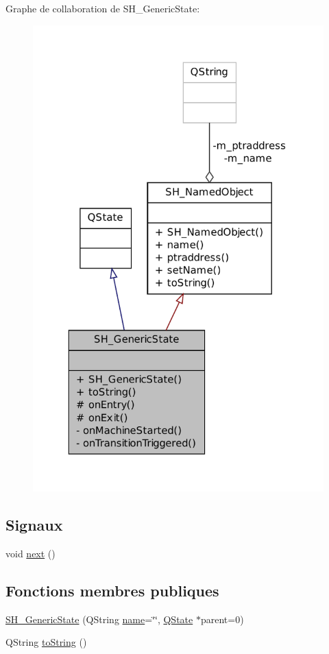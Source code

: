 Graphe de collaboration de S\-H\-\_\-\-Generic\-State\-:\nopagebreak
\begin{figure}[H]
\begin{center}
\leavevmode
\includegraphics[width=319pt]{classSH__GenericState__coll__graph}
\end{center}
\end{figure}
\subsection*{Signaux}
\begin{DoxyCompactItemize}
\item 
void \hyperlink{classSH__GenericState_a030e67a872956135c52e6876d960a7b5}{next} ()
\end{DoxyCompactItemize}
\subsection*{Fonctions membres publiques}
\begin{DoxyCompactItemize}
\item 
\hyperlink{classSH__GenericState_a3cc3cb1491b812dfdd032fc6438dfd4e}{S\-H\-\_\-\-Generic\-State} (Q\-String \hyperlink{classSH__NamedObject_a970f265df31b28b2179bbbceb6170ac2}{name}=\char`\"{}\char`\"{}, \hyperlink{classQState}{Q\-State} $\ast$parent=0)
\item 
Q\-String \hyperlink{classSH__GenericState_a5480c5ee725fd801d8f6292cd4c803b8}{to\-String} ()
\end{DoxyCompactItemize}

